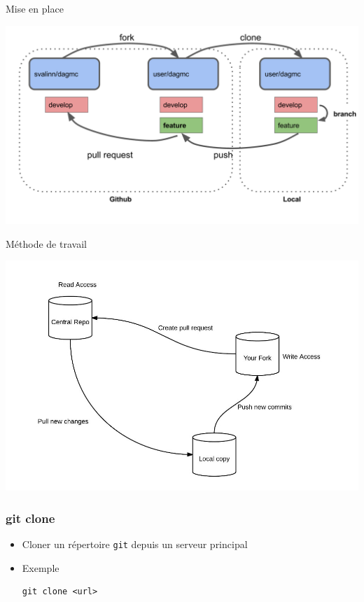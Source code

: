 \documentclass{beamer}
\begin{document}
\begin{frame}{Mise en place}
    \begin{center}
        \includegraphics[width=\textwidth]{img/github-setup.png}
    \end{center}
\end{frame}

\begin{frame}{Méthode de travail}
    \begin{center}
        \includegraphics[width=\textwidth]{img/github-workflow.jpg}
    \end{center}
\end{frame}

\begin{frame}[fragile]
\frametitle{git clone}

\begin{itemize}
\item Cloner un répertoire \texttt{git} depuis un serveur principal
\item Exemple
\begin{lstlisting}
git clone <url>
\end{lstlisting}
\end{itemize}
\end{frame}
\end{document}
